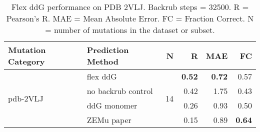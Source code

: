 \begin{table}
  \begin{tabular}{llrrrr}
\toprule
Mutation Category &   Prediction Method &   N &    R &  MAE &   FC \\
\midrule
 \multirow{ 4}{*}{pdb-2VLJ} & flex ddG & \multirow{ 4}{*}{14} & \textbf{0.52} & \textbf{0.72} & 0.57  \\
 & no backrub control & & 0.42 & 1.75 & 0.43  \\
 & ddG monomer & & 0.26 & 0.93 & 0.50  \\
 & ZEMu paper & & 0.15 & 0.89 & \textbf{0.64}  \\
\bottomrule
\end{tabular}
  \caption[Flex ddG performance on PDB 2VLJ]{
    Flex ddG performance on PDB 2VLJ. Backrub steps = 32500. R = Pearson's R. MAE = Mean Absolute Error. FC = Fraction Correct. N = number of mutations in the dataset or subset.
  } \label{tab:table-pdb-2VLJ}
\end{table}
